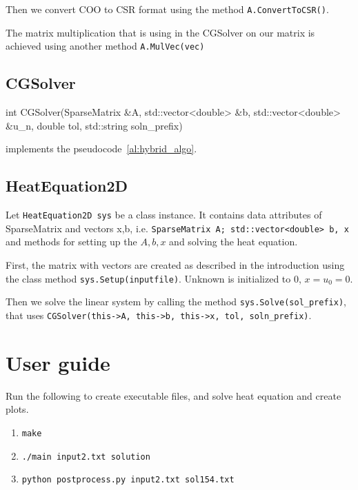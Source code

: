 \documentclass[12pt]{article}
\begin{document}
Then we convert COO to CSR format using the method \texttt{A.ConvertToCSR()}.

The matrix multiplication that is using in the CGSolver on our matrix is achieved using another method \texttt{A.MulVec(vec)}

\subsection{CGSolver}

\begin{cpp}
int CGSolver(SparseMatrix &A,
             std::vector<double> &b,
             std::vector<double> &u_n,
             double              tol,
             std::string soln_prefix)
\end{cpp}
implements the pseudocode~\ref{al:hybrid_algo}.


\subsection{HeatEquation2D}

Let \texttt{HeatEquation2D sys} be a class instance. It contains data attributes of SparseMatrix and vectors x,b, i.e. \texttt{SparseMatrix A;
    std::vector<double> b, x} and methods for setting up the $A,b,x$ and solving the heat equation.

First, the matrix with vectors are created as described in the introduction using the class method \texttt{sys.Setup(inputfile)}. Unknown is initialized to 0, $x=u_0 = 0$.

Then we solve the linear system by calling the method \texttt{sys.Solve(sol\_prefix)}, that uses \texttt{CGSolver(this->A, this->b, this->x, tol, soln\_prefix)}.


\section{User guide}


Run the following to create executable files, and solve heat equation and create plots.


\begin{enumerate}
    \item \texttt{make}
    \item \texttt{./main input2.txt solution}
    \item   \texttt{python postprocess.py input2.txt sol154.txt}
\end{enumerate}
\end{document}
